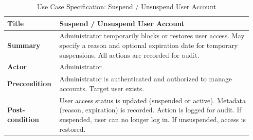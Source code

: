 \begin{table}[H]
    \centering
    \caption{Use Case Specification: Suspend / Unsuspend User Account}
    \begin{tabular}{|p{2.7cm}|p{12.5cm}|}
        \hline
        \textbf{Title}          & Suspend / Unsuspend User Account \\ \hline
        
        \textbf{Summary}        & Administrator temporarily blocks or restores user access. May specify a reason and optional expiration date for temporary suspensions. All actions are recorded for audit. \\ \hline
        
        \textbf{Actor}          & Administrator \\\hline
        
        \textbf{Precondition}   & Administrator is authenticated and authorized to manage accounts. Target user exists. \\ \hline
        
        \textbf{Post-condition} & User access status is updated (suspended or active). Metadata (reason, expiration) is recorded. Action is logged for audit. If suspended, user can no longer log in. If unsuspended, access is restored. \\ \hline
        

\end{tabular}
\end{table}
